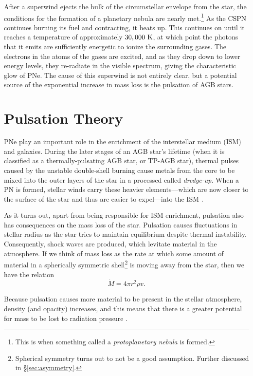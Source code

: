 \documentclass[twocolumn]{aastex63}
\begin{document}
After a superwind ejects the bulk of the circumstellar envelope from the star, the conditions for the formation of a planetary nebula are nearly met.\footnote{This is when something called a \textit{protoplanetary nebula} is formed.} As the CSPN continues burning its fuel and contracting, it heats up. This continues on until it reaches a temperature of approximately $30,000~{\rm K}$, at which point the photons that it emits are sufficiently energetic to ionize the surrounding gases. The electrons in the atoms of the gases are excited, and as they drop down to lower energy levels, they re-radiate in the visible spectrum, giving the characteristic glow of PNe. The cause of this superwind is not entirely clear, but a potential source of the exponential increase in mass loss is the pulsation of AGB stars. 



\section{Pulsation Theory} \label{sec:pulsation}
PNe play an important role in the enrichment of the interstellar medium (ISM) and galaxies. During the later stages of an AGB star's lifetime (when it is classified as a thermally-pulsating AGB star, or TP-AGB star), thermal pulses caused by the unstable double-shell burning cause metals from the core to be mixed into the outer layers of the star in a processed called \textit{dredge-up}. When a PN is formed, stellar winds carry these heavier elements—which are now closer to the surface of the star and thus are easier to expel—into the ISM \citep{iben}. 

As it turns out, apart from being responsible for ISM enrichment, pulsation also has consequences on the mass loss of the star. Pulsation causes fluctuations in stellar radius as the star tries to maintain equilibrium despite thermal instability. Consequently, shock waves are produced, which levitate material in the atmosphere. If we think of mass loss as the rate at which some amount of material in a spherically symmetric shell\footnote{Spherical symmetry turns out to not be a good assumption. Further discussed in \S \ref{sec:asymmetry}.} is moving away from the star, then we have the relation
\begin{equation*}
    \dot M = 4\pi r^2 \rho v.
\end{equation*}

Because pulsation causes more material to be present in the stellar atmosphere, density (and opacity) increases, and this means that there is a greater potential for mass to be lost to radiation pressure \citep{liljegren}. 
\end{document}

